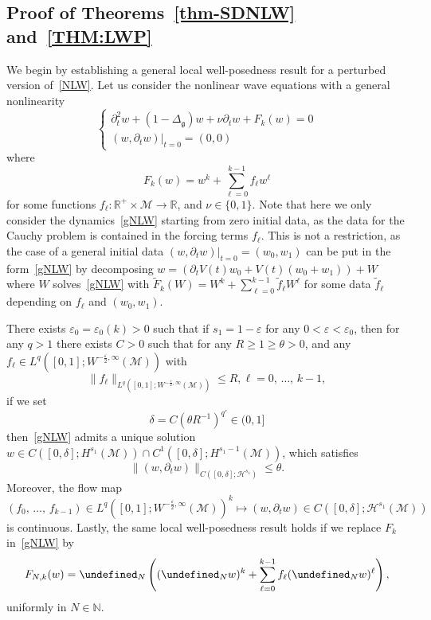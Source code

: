 \documentclass[10pt]{amsart}
\theoremstyle{definition}\newtheorem{defi}[theo]{Definition}\newtheorem{rema}[theo]{Remark}\newtheorem{exam}[theo]{Example}\newtheorem{exem}[theo]{Example}\newtheorem{nota}[theo]{Notation}
\newcommand{\R}{\mathbb{R}}
\newcommand{\N}{\mathbb{N}}
\let\P= \undefined
\newcommand{\P}{\mathbf{P}}
\newcommand{\M}{\mathcal{M}}
\renewcommand{\H}{\mathcal{H}}
\newcommand{\g}{\mathfrak{g}}
\newcommand{\dl}{\delta}
\newcommand{\Dlg}{\Delta_{\g}}
\newcommand{\eps}{\varepsilon}
\newcommand{\wt}{\widetilde}
\newcommand{\dt}{\partial_t}
\begin{document}
\subsection{Proof of Theorems~\ref{thm-SDNLW} and~\ref{THM:LWP}}\label{subsec-SDNLW+NLW}
We begin by establishing a general local well-posedness result for a perturbed version of~\eqref{NLW}. Let us consider the nonlinear wave equations with a general nonlinearity
\begin{equation}\label{gNLW}
\begin{cases}
\dt^2 w +(1 - \Dlg) w + \nu\dt w + F_k(w) = 0 \\
(w, \dt w) |_{t = 0} = (0,0)
\end{cases}
\end{equation}
where
\begin{equation*}
F_k(w)=w^k+\sum_{\ell=0}^{k-1} f_{\ell}w^{\ell}
\end{equation*}
for some functions $f_{\ell}: \R^+\times\M \rightarrow \R$, and $\nu\in \{0,1\}$. Note that here we only consider the dynamics~\eqref{gNLW} starting from zero initial data, as the data for the Cauchy problem is contained in the forcing terms $f_\ell$. This is not a restriction, as the case of a general initial data $(w,\dt w)|_{t=0}=(w_0,w_1)$ can be put in the form~\eqref{gNLW} by decomposing $w = (\dt V(t)w_0 + V(t)(w_0+w_1)) + W$ where $W$ solves~\eqref{gNLW} with $\wt F_k(W)=W^k+\sum_{\ell=0}^{k-1}\wt f_\ell W^\ell$ for some data $\wt f_\ell$ depending on $f_\ell$ and $(w_0,w_1)$.

\begin{prop}\label{prop-glocal}
There exists $\eps_0=\eps_0(k)>0$ such that if $s_1=1-\eps$ for any $0<\eps<\eps_0$, then for any $q> 1$ there exists $C>0$ such that for any $R\geq 1\geq \theta>0$, and any $f_{\ell}\in L^q([0,1];W^{-\frac\eps2,\infty}(\M))$ with 
\[
\|f_{\ell}\|_{L^q\left([0,1];W^{-\frac\eps2,\infty}(\M)\right)}\leq R, \ell=0,\,\dots,\,k-1,
\]
if we set
\begin{equation*}
\dl=C\left(\theta R^{-1}\right)^{q'}\in (0,1]
\end{equation*}
then~\eqref{gNLW} admits a unique solution $w\in C([0,\dl];H^{s_1}(\M))\cap C^1([0,\dl];H^{s_1-1}(\M))$, which satisfies
\begin{equation*}
\|(w,\dt w)\|_{C\left([0,\dl];\H^{s_1}\right)}\leq \theta.
\end{equation*}
Moreover, the flow map
\begin{equation*}
(f_0,\,\dots,\,f_{k-1})\in L^q\left([0,1];W^{-\frac{\eps}2,\infty}(\M)\right)^k \longmapsto (w,\dt w)\in C\left([0,\dl];\H^{s_1}(\M)\right)
\end{equation*}
is continuous. Lastly, the same local well-posedness result holds if we replace $F_k$ in~\eqref{gNLW} by
\begin{equation}\label{FNk}
F_{N,k}(w)= \P_N\left((\P_Nw)^k + \sum_{\ell=0}^{k-1}f_{\ell}(\P_N w)^{\ell}\right),
\end{equation}
uniformly in $N\in\N$.
\end{prop}
\end{document}
